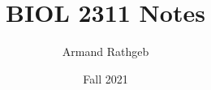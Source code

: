 \documentclass{article}
\title{BIOL 2311 Notes}
\author{Armand Rathgeb}
\date{Fall 2021}
\begin{document}
  \maketitle
  \newpage
  \section{}
    
  \section{}
\end{document}
